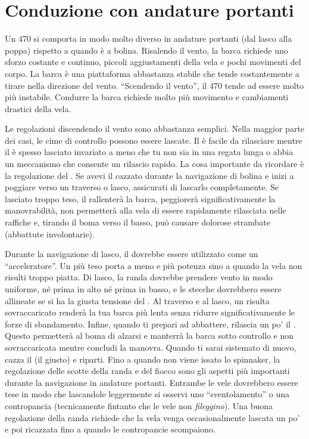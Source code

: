 
\section{Conduzione con andature portanti}
\label{sec:conduzione_andature_portanti}
Un 470 si comporta in modo molto diverso in andature portanti (dal lasco alla
poppa) rispetto a quando è a bolina. Risalendo il vento, la barca richiede uno
sforzo costante e continuo, piccoli aggiustamenti della vela e pochi movimenti
del corpo. La barca è una piattaforma abbastanza stabile che tende costantemente
a tirare nella direzione del vento. ``Scendendo il vento'', il 470 tende ad
essere molto più instabile. Condurre la barca richiede molto più movimento e
cambiamenti drastici della vela.

Le regolazioni discendendo il vento sono abbastanza semplici. Nella maggior
parte dei casi, le cime di controllo possono essere lascate. Il \cunningham è
facile da rilasciare mentre il \outhaul è spesso lasciato invariato a meno che
tu non sia in una regata lunga o abbia un meccanismo che consente un rilascio
rapido. La cosa importante da ricordare è la regolazione del \vang. Se avevi il
\vang cazzato durante la navigazione di bolina e inizi a poggiare verso un
traverso o lasco, assicurati di lascarlo completamente. Se lasciato troppo teso,
il \vang rallenterà la barca, peggiorerà significativamente la manovrabilità, non
permetterà alla vela di essere rapidamente rilasciata nelle raffiche e, tirando
il boma verso il basso, può causare dolorose strambate (abbattute involontarie).

Durante la navigazione di lasco, il \vang dovrebbe essere utilizzato come un
``acceleratore''. Un \vang più teso porta a meno \twist e più potenza sino a
quando la vela non risulti troppo piatta. Di lasco, la randa dovrebbe prendere
vento in modo uniforme, né prima in alto né prima in basso, e le stecche
dovrebbero essere allineate se si ha la giusta tensione del \vang. Al traverso e
al lasco, un \vang risulta sovraccaricato renderà la tua barca più lenta senza
ridurre significativamente le forze di sbandamento. Infine, quando ti prepari ad
abbattere, rilascia un po' il \vang. Questo permetterà al boma di alzarsi e
manterrà la barca sotto controllo e non sovraccaricata mentre concludi la
manovra. Quando ti sarai sistemato di nuovo, cazza il \vang (il giusto) e
riparti. Fino a quando non viene issato lo spinnaker, la regolazione delle
scotte della randa e del fiocco sono gli aspetti più importanti durante la
navigazione in andature portanti. Entrambe le vele dovrebbero essere tese in
modo che lascandole leggermente si osservi uno ``sventolamento'' o una
contropancia (tecnicamente fintanto che le vele non \emph{fileggino}). Una buona
regolazione della randa richiede che la vela venga occasionalmente lascata un
po' e poi ricazzata fino a quando le contropancie scompaiono.

